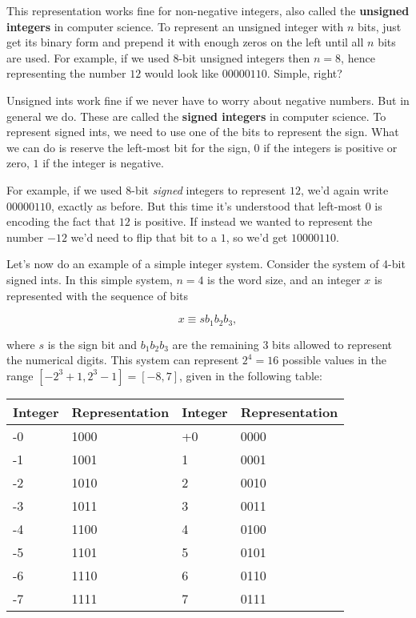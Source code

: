 \documentclass[
  letterpaper,
  DIV=11,
  numbers=noendperiod]{scrreprt}
\begin{document}
This representation works fine for non-negative integers, also called
the \textbf{unsigned integers} in computer science. To represent an
unsigned integer with \(n\) bits, just get its binary form and prepend
it with enough zeros on the left until all \(n\) bits are used. For
example, if we used 8-bit unsigned integers then \(n=8\), hence
representing the number \(12\) would look like \(00000110\). Simple,
right?

Unsigned ints work fine if we never have to worry about negative
numbers. But in general we do. These are called the \textbf{signed
integers} in computer science. To represent signed ints, we need to use
one of the bits to represent the sign. What we can do is reserve the
left-most bit for the sign, \(0\) if the integers is positive or zero,
\(1\) if the integer is negative.

For example, if we used 8-bit \emph{signed} integers to represent
\(12\), we'd again write \(00000110\), exactly as before. But this time
it's understood that left-most \(0\) is encoding the fact that \(12\) is
positive. If instead we wanted to represent the number \(-12\) we'd need
to flip that bit to a \(1\), so we'd get \(10000110\).

Let's now do an example of a simple integer system. Consider the system
of 4-bit signed ints. In this simple system, \(n=4\) is the word size,
and an integer \(x\) is represented with the sequence of bits

\[x \equiv sb_1b_2b_3,\]

where \(s\) is the sign bit and \(b_1b_2b_3\) are the remaining 3 bits
allowed to represent the numerical digits. This system can represent
\(2^4=16\) possible values in the range \([-2^3+1,2^3-1] = [-8,7]\),
given in the following table:

\begin{longtable}[]{@{}llll@{}}
\toprule()
Integer & Representation & Integer & Representation \\
\midrule()
\endhead
-0 & 1000 & +0 & 0000 \\
-1 & 1001 & 1 & 0001 \\
-2 & 1010 & 2 & 0010 \\
-3 & 1011 & 3 & 0011 \\
-4 & 1100 & 4 & 0100 \\
-5 & 1101 & 5 & 0101 \\
-6 & 1110 & 6 & 0110 \\
-7 & 1111 & 7 & 0111 \\
\bottomrule()
\end{longtable}
\end{document}
